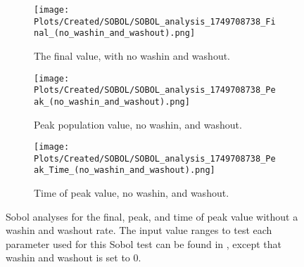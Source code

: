 \begin{figure}[ht!]
    \centering
    \begin{subfigure}{0.32\linewidth}
        \centering
        \captionsetup{width=1\linewidth}
        \texttt{[image: Plots/Created/SOBOL/SOBOL\_analysis\_1749708738\_Final\_(no\_washin\_and\_washout).png]}
        \caption{
            The final value, with no washin and washout. 
        }
        \label{fig:created:Sobol_final_no_wi_wo}
    \end{subfigure}
    \hfill
    \begin{subfigure}{0.32\linewidth}
        \centering
        \captionsetup{width=1\linewidth}
        \texttt{[image: Plots/Created/SOBOL/SOBOL\_analysis\_1749708738\_Peak\_(no\_washin\_and\_washout).png]}
        \caption{
            Peak population value, no washin, and washout. 
        }
        \label{fig:created:Sobol_peak_no_wi_wo}
    \end{subfigure}
    \hfill
    \begin{subfigure}{0.32\linewidth}
        \centering
        \captionsetup{width=1\linewidth}
        \texttt{[image: Plots/Created/SOBOL/SOBOL\_analysis\_1749708738\_Peak\_Time\_(no\_washin\_and\_washout).png]}
        \caption{
            Time of peak value, no washin, and washout. 
        }
        \label{fig:created:Sobol_peak_time_no_wi_wo}
    \end{subfigure}
    \caption{
        Sobol analyses for the final, peak, and time of peak value without a washin and washout rate.
        The input value ranges to test each parameter used for this Sobol test can be found in , except that washin and washout is set to 0. 
    }
    \label{fig:created:Sobol_no_wi_wo}
\end{figure}

